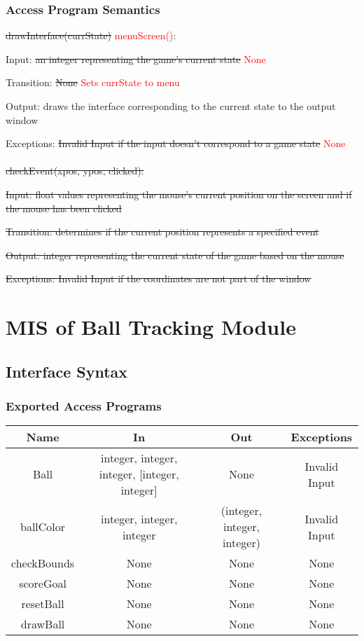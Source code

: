 \documentclass[12pt, titlepage]{article}
\begin{document}
		\subsubsection{Access Program Semantics}
		\sout{drawInterface(currState)} \textcolor{red}{menuScreen()}:
		
		Input: \sout{an integer representing the game's current state} \textcolor{red}{None}
		
		Transition: \sout{None} \textcolor{red}{Sets currState to menu}
		
		Output: draws the interface corresponding to the current state to the output window
		
		Exceptions: \sout{Invalid Input if the input doesn't correspond to a game state} \textcolor{red}{None}\\
		\\
		\sout{checkEvent(xpos, ypos, clicked):}
		
		\sout{Input: float values representing the mouse's current position on the screen and if the mouse has been clicked}
		
		\sout{Transition: determines if the current position represents a specified event}
		
		\sout{Output: integer representing the current state of the game based on the mouse}
		
		\sout{Exceptions: Invalid Input if the coordinates are not part of the window}
		
	
\section{MIS of Ball Tracking Module}
		\subsection{Interface Syntax}
		\subsubsection{Exported Access Programs}
		\begin{tabular}[pos]{|c|c|c|c|}
			\hline
			\textbf{Name}& \textbf{In} & \textbf{Out} & \textbf{Exceptions} \\ \hline
			Ball & integer, integer, integer, [integer, integer] & None & Invalid Input \\ \hline
			ballColor & integer, integer, integer & (integer, integer, integer) & Invalid Input \\ \hline
			checkBounds & None & None & None \\ \hline
			scoreGoal & None & None & None \\ \hline
			resetBall & None & None & None \\ \hline
			drawBall & None & None & None \\ \hline
		\end{tabular}
		
\end{document}
